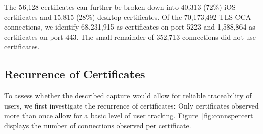 The 56,128 {\apns} certificates can further be broken down into 40,313 (72\%) iOS certificates and 15,815 (28\%) desktop certificates.
Of the 70,173,492 TLS CCA connections, we identify 68,231,915 as {\apns} certificates on port 5223 and 1,588,864 as {\apns} certificates on port 443.
The small remainder of 352,713 connections did not use {\apns} certificates.

\subsection{Recurrence of Certificates}
To assess whether the described capture would allow for reliable traceability of users, we first investigate the recurrence of certificates: Only certificates observed more  than once allow for a basic level of user tracking. Figure~\ref{fig:connspercert} displays the number of connections observed per certificate.

